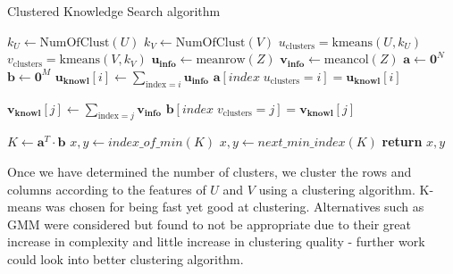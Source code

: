 \begin{algorithm}
\caption{Clustered Knowledge Search algorithm}\label{alg:cks}
\begin{algorithmic}[1]
\State $k_U \gets \text{NumOfClust}(U)$ 
\State $k_V \gets \text{NumOfClust}(V)$
\State $u_{\text{clusters}} = \text{kmeans}(U,k_U)$ 
\State $v_{\text{clusters}} = \text{kmeans}(V,k_V)$
\State $\mathbf{u_{info}} \gets \text{meanrow}(Z)$ 
\State $\mathbf{v_{info}} \gets \text{meancol}(Z)$ 
\State $\mathbf{a} \gets \mathbf{0}^{N}$ 
\State $\mathbf{b} \gets \mathbf{0}^{M}$ 
\State $\mathbf{u_{knowl}}[i] \gets \sum\limits_{\text{index}=i} \mathbf{u_{info}}$ 
\State $\mathbf{a}[{index\; u_{\text{clusters}} =i}] = \mathbf{u_{knowl}}[i]$ 
\EndFor

\State $\mathbf{v_{knowl}}[j] \gets \sum\limits_{\text{index}=j} \mathbf{v_{info}}$
\State $\mathbf{b}[{index\; v_{\text{clusters}} =j}] = \mathbf{v_{knowl}}[j]$
\EndFor

\State $K \gets \mathbf{a}^T \cdot \mathbf{b}$ 
\State $x,y \gets index\_of\_min(K)$  \label{alg:line:select}
\State $x,y \gets next\_min\_index(K)$
\EndWhile
\State \textbf{return} $x,y$
\EndProcedure
\end{algorithmic}
\end{algorithm}

Once we have determined the number of clusters, we cluster the rows and columns according to the features of $U$ and $V$ using a clustering algorithm. K-means was chosen for being fast yet good at clustering. Alternatives such as GMM were considered but found to not be appropriate due to their great increase in complexity and little increase in clustering quality - further work could look into better clustering algorithm.




